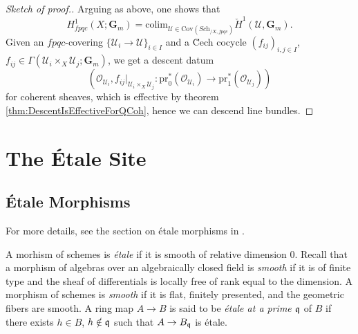 \begin{proof}[Sketch of proof.]
Arguing as above, one shows that
$$
H_{fpqc}^1(X ; \mathbf{G}_m) = \text{colim}_{\mathcal{U} \in \text{Cov}(\textit{Sch}_{/X,fpqc})} \check H^1(\mathcal{U}, \mathbf{G}_m).
$$
Given an $fpqc$-covering $\{ \mathcal{U}_i \to \mathcal{U} \}_{i \in I}$ and a \u Cech cocycle $(f_{ij})_{i,j \in I}$, $f_{ij} \in \Gamma(\mathcal{U}_i \times_X \mathcal{U}_j; \mathbf{G}_m)$, we get a descent datum
$$
\left(\mathcal{O}_{\mathcal{U}_i}, f_{ij} |_{\mathcal{U}_i \times_X \mathcal{U}_j}: \text{pr}_0^*(\mathcal{O}_{\mathcal{U}_i}) \to \text{pr}_1^*(\mathcal{O}_{\mathcal{U}_j})\right)
$$
for coherent sheaves, which is effective by theorem \ref{thm:DescentIsEffectiveForQCoh}, hence we can descend line bundles.
\end{proof}

\section{The \'Etale Site}
\subsection{\'Etale Morphisms}

For more details, see the section on \'etale morphisms in \cite{Stacks}.

\begin{definition}
A morhism of schemes is \emph{\'etale} if it is smooth of relative dimension 0. Recall that a morphism of algebras over an algebraically closed field is \emph{smooth} if it is of finite type and the sheaf of differentials is locally free of rank equal to the dimension. A morphism of schemes is \emph{smooth} if it is flat, finitely presented, and the geometric fibers are smooth. A ring map $A \to B$ is said to be \emph{\'etale at a prime $\frak q$} of $B$ if there exists $h \in B$, $h \notin \frak q$ such that $A \to B_{\frak q}$ is \'etale.
\end{definition}

